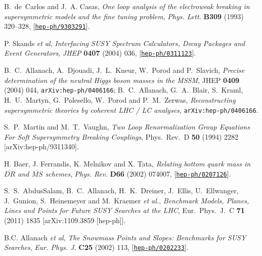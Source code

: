 \documentclass[]{article}
\def\hepph#1{{\tt arXiv:hep-ph/0406166}}
\begin{document}
\begin{thebibliography}{10}
 B.~de~Carlos and J.~A. Casas, {\it One loop analysis of the electroweak
   breaking in supersymmetric models and the fine tuning problem},  {\em Phys.
   Lett.} {\bf B309} (1993) 320--328,
   [\href{http://xxx.lanl.gov/abs/hep-ph/9303291}{{\tt hep-ph/9303291}}].

P. Skands {\em et al}, {\it Interfacing SUSY Spectrum Calculators, Decay
  Packages and Event Generators}, {\em JHEP} {\bf 0407} (2004) 036,
  [\href{http://xxx.lanl.gov/abs/hep-ph/0311123}{{\tt hep-ph/0311123}}].


B.~C.~Allanach, A.~Djouadi, J.~L.~Kneur, W.~Porod and P.~Slavich,
{\em Precise determination of the neutral Higgs boson masses in the MSSM},   JHEP {\bf 0409} (2004) 044,
\hepph{0406166};
B.~C.~Allanach, G.~A.~Blair, S.~Kraml, H.~U.~Martyn, G.~Polesello, W.~Porod and P.~M.~Zerwas,
{\em Reconstructing supersymmetric theories by coherent LHC / LC analyses},
\hepph{0403133}.

 S.~P.~Martin and M.~T.~Vaughn,
  {\em Two Loop Renormalization Group Equations For Soft Supersymmetry Breaking
  Couplings},
  Phys.\ Rev.\  D {\bf 50} (1994) 2282
  [arXiv:hep-ph/9311340].



H. Baer, J. Ferrandis, K. Melnikov and X. Tata, {\it Relating bottom quark
  mass in $\overline{DR}$ and $\overline{MS}$ schemes},
{\em Phys. Rev.} {\bf D66} (2002) 074007,
  [\href{http://xxx.lanl.gov/abs/hep-ph/0207126}{{\tt hep-ph/0207126}}].

S.~S.~AbdusSalam, B.~C.~Allanach, H.~K.~Dreiner, J.~Ellis, U.~Ellwanger, J.~Gunion, S.~Heinemeyer and M.~Kraemer {\it et al.},
  {\em Benchmark Models, Planes, Lines and Points for Future SUSY Searches at the LHC},
  Eur.\ Phys.\ J.\ C {\bf 71} (2011) 1835
  [arXiv:1109.3859 [hep-ph]].

B.C. Allanach {\em et al}, {\it The Snowmass Points and Slopes: Benchmarks for
  SUSY Searches}, {\em Eur. Phys. J.} {\bf C25} (2002) 113,
 [\href{http://xxx.lanl.gov/abs/hep-ph/0202233}{{\tt hep-ph/0202233}}].



\end{thebibliography}
\end{document}
